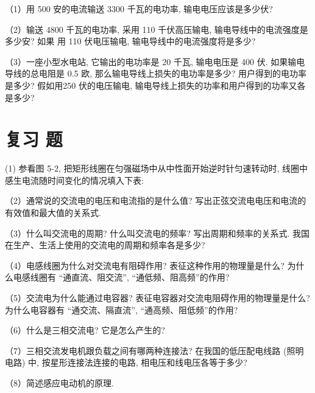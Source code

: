 \documentclass[10pt]{article}
\begin{document}
（1）用 500 安的电流输送 3300 千瓦的电功率, 输电电压应该是多少伏?

（2）输送 4800 千瓦的电功率, 采用 110 千伏高压输电, 输电导线中的电流强度是多少安? 如果 用 110 伏电压输电, 输电导线中的电流强度将是多少?

（3）一座小型水电站, 它输出的电功率是 20 千瓦, 输电电压是 400 伏. 如果输电导线的总电阻是 0.5 欧, 那么输电导线上损失的电功率是多少? 用户得到的电功率是多少? 假如用250 伏的电压输电, 输电导线上损失的功率和用户得到的功率又各是多少?

\section*{复习 题}

(1) 参看图 5-2, 把矩形线圈在匀强磁场中从中性面开始逆时针匀速转动时, 线圈中感生电流随时间变化的情况填入下表:

\begin{center}
\end{center}

（2）通常说的交流电的电压和电流指的是什么值? 写出正弦交流电电压和电流的有效值和最大值的关系式.

（3）什么叫交流电的周期? 什么叫交流电的频率? 写出周期和频率的关系式. 我国在生产、生活上使用的交流电的周期和频率各是多少?

（4）电感线圈为什么对交流电有阻碍作用? 表征这种作用的物理量是什么? 为什么电感线圈有 “通直流、阻交流”, “通低频、阻高频”的作用?

（5）交流电为什么能通过电容器? 表征电容器对交流电阻碍作用的物理量是什么? 为什么电容器有 “通交流、隔直流”, “通高频、阻低频”的作用?

（6）什么是三相交流电? 它是怎么产生的?

（7）三相交流发电机跟负载之间有哪两种连接法? 在我国的低压配电线路 (照明电路) 中, 按星形连接法连接的电路, 相电压和线电压各等于多少?

（8）简述感应电动机的原理.
\end{document}
